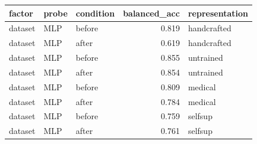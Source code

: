 \begin{tabular}{lllrl}
\toprule
factor & probe & condition & balanced\_acc & representation \\
\midrule
dataset & MLP & before & 0.819 & handcrafted \\
dataset & MLP & after & 0.619 & handcrafted \\
dataset & MLP & before & 0.855 & untrained \\
dataset & MLP & after & 0.854 & untrained \\
dataset & MLP & before & 0.809 & medical \\
dataset & MLP & after & 0.784 & medical \\
dataset & MLP & before & 0.759 & selfsup \\
dataset & MLP & after & 0.761 & selfsup \\
\bottomrule
\end{tabular}
